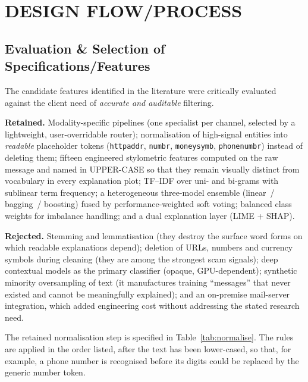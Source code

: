 \documentclass[12pt,a4paper]{report}
\begin{document}
\chapter{DESIGN FLOW/PROCESS}

\section{Evaluation \& Selection of Specifications/Features}

The candidate features identified in the literature were critically evaluated
against the client need of \emph{accurate and auditable} filtering.

\textbf{Retained.} Modality-specific pipelines (one specialist per channel,
selected by a lightweight, user-overridable router); normalisation of
high-signal entities into \emph{readable} placeholder tokens
(\texttt{httpaddr}, \texttt{numbr}, \texttt{moneysymb}, \texttt{phonenumbr})
instead of deleting them; fifteen engineered stylometric features computed on
the raw message and named in UPPER-CASE so that they remain visually distinct
from vocabulary in every explanation plot; TF--IDF over uni- and bi-grams
with sublinear term frequency; a heterogeneous three-model ensemble
(linear~/ bagging~/ boosting) fused by performance-weighted soft voting;
balanced class weights for imbalance handling; and a dual explanation layer
(LIME + SHAP).

\textbf{Rejected.} Stemming and lemmatisation (they destroy the surface word
forms on which readable explanations depend); deletion of URLs, numbers and
currency symbols during cleaning (they are among the strongest scam signals);
deep contextual models as the primary classifier (opaque, GPU-dependent);
synthetic minority oversampling of text (it manufactures training
``messages'' that never existed and cannot be meaningfully explained); and an
on-premise mail-server integration, which added engineering cost without
addressing the stated research need.

The retained normalisation step is specified in Table~\ref{tab:normalise}. The
rules are applied in the order listed, after the text has been lower-cased, so
that, for example, a phone number is recognised before its digits could be
replaced by the generic number token.
\end{document}

